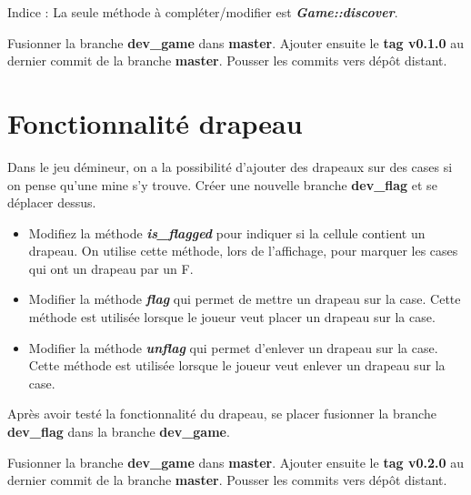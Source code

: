 \medskip

Indice : La seule méthode à compléter/modifier est \textit{\textbf{Game::discover}}.

\medskip

Fusionner la branche \textbf{dev\_game} dans \textbf{master}. Ajouter ensuite le \textbf{tag v0.1.0} au dernier commit de la branche \textbf{master}. Pousser les commits vers dépôt distant.

\section{Fonctionnalité drapeau}
Dans le jeu démineur, on a la possibilité d'ajouter des drapeaux sur des cases si on pense qu'une mine s'y trouve. Créer une nouvelle branche \textbf{dev\_flag} et se déplacer dessus.
\medskip
\begin{itemize}
    \item Modifiez la méthode \textit{\textbf{is\_flagged}} pour indiquer si la cellule contient un drapeau. On utilise cette méthode, lors de l'affichage, pour marquer les cases qui ont un drapeau par un F.
    \medskip
    \item Modifier la méthode \textit{\textbf{flag}} qui permet de mettre un drapeau sur la case. Cette méthode est utilisée lorsque le joueur veut placer un drapeau sur la case.
    \medskip
    \item Modifier la méthode \textit{\textbf{unflag}} qui permet d'enlever un drapeau sur la case. Cette méthode est utilisée lorsque le joueur veut enlever un drapeau sur la case.
\end{itemize}

\medskip

Après avoir testé la fonctionnalité du drapeau, se placer fusionner la branche \textbf{dev\_flag} dans la branche \textbf{dev\_game}.

\medskip

Fusionner la branche \textbf{dev\_game} dans \textbf{master}. Ajouter ensuite le \textbf{tag v0.2.0} au dernier commit de la branche \textbf{master}. Pousser les commits vers dépôt distant.

